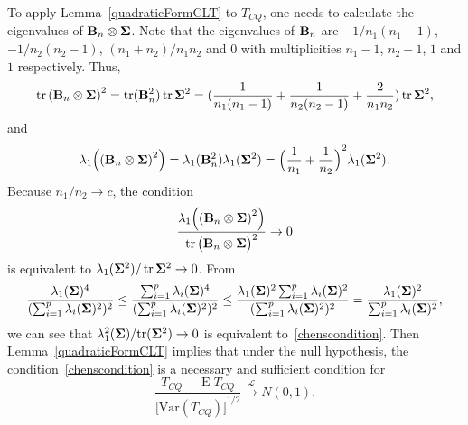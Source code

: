 \documentclass[3p]{elsarticle}
\DeclareMathOperator{\mytr}{tr}
\DeclareMathOperator{\myE}{E}
\theoremstyle{plain}
\theoremstyle{definition}
\theoremstyle{remark}
\begin{document}
To apply Lemma~\ref{quadraticFormCLT} to $T_{CQ}$, one needs to calculate the eigenvalues of $\mathbf{B}_n\otimes \boldsymbol{\Sigma}$.
    Note that the eigenvalues of $\mathbf{B}_n$ are $-1/n_1(n_1-1)$, $-1/n_2(n_2-1)$, $(n_1+n_2)/n_1 n_2$ and $0$ with multiplicities $n_1-1$, $n_2-1$, $1$ and $1$ respectively.
    Thus,
    \begin{equation*}
        \mytr{(\BB_n\otimes \bSigma)}^2=\mytr(\BB_n^2)\mytr\bSigma^2=(\frac{1}{n_1(n_1-1)}+\frac{1}{n_2(n_2-1)}+\frac{2}{n_1 n_2})\mytr\bSigma^2,
    \end{equation*}
and
    \begin{equation*}
        \lambda_{1}\Big({(\mathbf{B}_n\otimes \boldsymbol{\Sigma})}^2\Big)=\lambda_{1}(\mathbf{B}_n^2)\lambda_{1}(\boldsymbol{\Sigma}^2)={\Big(\frac{1}{n_1}+\frac{1}{n_2}\Big)}^2\lambda_{1}(\boldsymbol{\Sigma}^2).
    \end{equation*}
    Because $n_1/n_2\to c$, the condition
    $$
         \frac{\lambda_{1}\Big({(\BB_n\otimes \bSigma)}^2\Big)}{
\mytr{\big(\BB_n\otimes \bSigma\big)}^2}
         \to 0
    $$
     is equivalent to $\lambda_{1}(\bSigma^2)/\mytr\bSigma^2\to 0$.
From
$$
\frac{\lambda_1(\boldsymbol{\Sigma})^4}{(\sum_{i=1}^p \lambda_i(\boldsymbol{\Sigma})^2)^2}
\leq
\frac{\sum_{i=1}^p\lambda_i(\boldsymbol{\Sigma})^4}{(\sum_{i=1}^p \lambda_i(\boldsymbol{\Sigma})^2)^2}
\leq
\frac{\lambda_1(\boldsymbol{\Sigma})^2\sum_{i=1}^p\lambda_i(\boldsymbol{\Sigma})^2}{(\sum_{i=1}^p \lambda_i(\boldsymbol{\Sigma})^2)^2}
=
\frac{\lambda_1(\boldsymbol{\Sigma})^2}{\sum_{i=1}^p \lambda_i(\boldsymbol{\Sigma})^2},
$$
    we can see that ${\lambda_{1}^2(\boldsymbol{\Sigma})}/{\mathrm{tr}(\boldsymbol{\Sigma}^2)}\to 0$  is equivalent to~\eqref{chenscondition}.
Then Lemma~\ref{quadraticFormCLT} implies that under the null hypothesis, the condition~\eqref{chenscondition} is a necessary and sufficient condition for 
    \begin{equation*}
        \frac{T_{CQ}-\myE T_{CQ}}{{\big[\mathrm{Var}(T_{CQ})\big]}^{1/2}}\xrightarrow{\mathcal{L}}N(0,1).
    \end{equation*}
\end{document}
